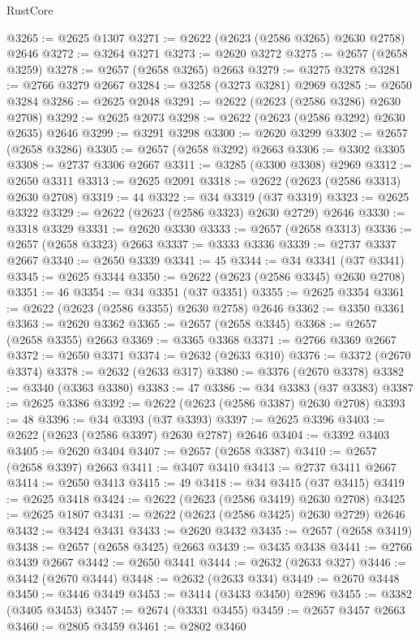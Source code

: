 \begin{lexlean}{RustCore}
\begin{coremodule}
@3265 := @2625 @1307
@3271 := @2622 (@2623 (@2586 @3265) @2630 @2758) @2646
@3272 := @3264 @3271
@3273 := @2620 @3272
@3275 := @2657 (@2658 @3259)
@3278 := @2657 (@2658 @3265) @2663
@3279 := @3275 @3278
@3281 := @2766 @3279 @2667
@3284 := @3258 (@3273 @3281) @2969
@3285 := @2650 @3284
@3286 := @2625 @2048
@3291 := @2622 (@2623 (@2586 @3286) @2630 @2708)
@3292 := @2625 @2073
@3298 := @2622 (@2623 (@2586 @3292) @2630 @2635) @2646
@3299 := @3291 @3298
@3300 := @2620 @3299
@3302 := @2657 (@2658 @3286)
@3305 := @2657 (@2658 @3292) @2663
@3306 := @3302 @3305
@3308 := @2737 @3306 @2667
@3311 := @3285 (@3300 @3308) @2969
@3312 := @2650 @3311
@3313 := @2625 @2091
@3318 := @2622 (@2623 (@2586 @3313) @2630 @2708)
@3319 := 44
@3322 := @34 @3319 (@37 @3319)
@3323 := @2625 @3322
@3329 := @2622 (@2623 (@2586 @3323) @2630 @2729) @2646
@3330 := @3318 @3329
@3331 := @2620 @3330
@3333 := @2657 (@2658 @3313)
@3336 := @2657 (@2658 @3323) @2663
@3337 := @3333 @3336
@3339 := @2737 @3337 @2667
@3340 := @2650 @3339
@3341 := 45
@3344 := @34 @3341 (@37 @3341)
@3345 := @2625 @3344
@3350 := @2622 (@2623 (@2586 @3345) @2630 @2708)
@3351 := 46
@3354 := @34 @3351 (@37 @3351)
@3355 := @2625 @3354
@3361 := @2622 (@2623 (@2586 @3355) @2630 @2758) @2646
@3362 := @3350 @3361
@3363 := @2620 @3362
@3365 := @2657 (@2658 @3345)
@3368 := @2657 (@2658 @3355) @2663
@3369 := @3365 @3368
@3371 := @2766 @3369 @2667
@3372 := @2650 @3371
@3374 := @2632 (@2633 @310)
@3376 := @3372 (@2670 @3374)
@3378 := @2632 (@2633 @317)
@3380 := @3376 (@2670 @3378)
@3382 := @3340 (@3363 @3380)
@3383 := 47
@3386 := @34 @3383 (@37 @3383)
@3387 := @2625 @3386
@3392 := @2622 (@2623 (@2586 @3387) @2630 @2708)
@3393 := 48
@3396 := @34 @3393 (@37 @3393)
@3397 := @2625 @3396
@3403 := @2622 (@2623 (@2586 @3397) @2630 @2787) @2646
@3404 := @3392 @3403
@3405 := @2620 @3404
@3407 := @2657 (@2658 @3387)
@3410 := @2657 (@2658 @3397) @2663
@3411 := @3407 @3410
@3413 := @2737 @3411 @2667
@3414 := @2650 @3413
@3415 := 49
@3418 := @34 @3415 (@37 @3415)
@3419 := @2625 @3418
@3424 := @2622 (@2623 (@2586 @3419) @2630 @2708)
@3425 := @2625 @1807
@3431 := @2622 (@2623 (@2586 @3425) @2630 @2729) @2646
@3432 := @3424 @3431
@3433 := @2620 @3432
@3435 := @2657 (@2658 @3419)
@3438 := @2657 (@2658 @3425) @2663
@3439 := @3435 @3438
@3441 := @2766 @3439 @2667
@3442 := @2650 @3441
@3444 := @2632 (@2633 @327)
@3446 := @3442 (@2670 @3444)
@3448 := @2632 (@2633 @334)
@3449 := @2670 @3448
@3450 := @3446 @3449
@3453 := @3414 (@3433 @3450) @2896
@3455 := @3382 (@3405 @3453)
@3457 := @2674 (@3331 @3455)
@3459 := @2657 @3457 @2663
@3460 := @2805 @3459
@3461 := @2802 @3460

\end{coremodule}
\end{lexlean}
